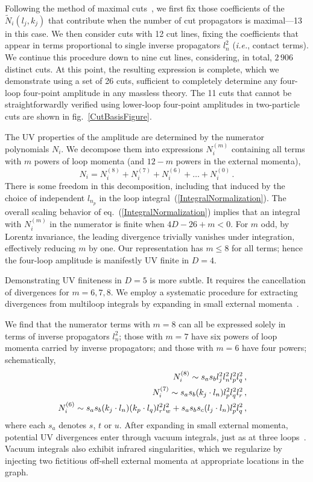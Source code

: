 \documentclass[aps,prl,twocolumn,groupedaddress,draft,showpacs,nofootinbib]{revtex4}
\def\fig#1{fig.~{\ref{#1}}}
\def\nn{\nonumber}
\def\eqn#1{eq.~(\ref{#1})}
\begin{document}
Following the method of maximal cuts~\cite{FiveLoop,CompactThree}, we
first fix those coefficients of the $\widetilde N_i(l_j,k_j)$ 
that contribute when the number of cut propagators is
maximal---13 in this case. We then
consider cuts with 12 cut lines, fixing the coefficients that appear
in terms proportional to single inverse propagators $l_n^2$ ({\it i.e.},
contact terms).  We continue this procedure down to nine cut lines,
considering, in total, $2\,906$ distinct cuts.  At this
point, the resulting expression is complete, which we demonstrate using a
set of 26 cuts, sufficient to completely determine any four-loop
four-point amplitude in any massless theory.  
The 11 cuts that cannot be straightforwardly verified using
lower-loop four-point amplitudes in two-particle cuts are shown in 
\fig{CutBasisFigure}.

The UV properties of the amplitude are determined by the
numerator polynomials $N_i$.  We decompose them into 
expressions $N_i^{(m)}$ containing all terms with $m$ powers of
loop momenta (and ${12-m}$ powers in the external momenta),
%
\begin{equation}
N_i = N_i^{(8)} + N_i^{(7)}  + N_i^{(6)}+ \ldots + N_i^{(0)} \,.
\end{equation}
%
There is some freedom in this decomposition, including
that induced by the choice of independent $l_{n_p}$ 
in the loop integral~(\ref{IntegralNormalization}). 
The overall scaling behavior of
\eqn{IntegralNormalization} implies that an integral with $N_i^{(m)}$
in the numerator is finite when $4 D - 26 + m <0$.  For $m$ odd, by
Lorentz invariance, the leading divergence trivially vanishes under
integration, effectively reducing $m$ by one.  Our representation has
$m\le 8$ for all terms; hence the four-loop amplitude is manifestly UV
finite in $D=4$.

Demonstrating UV finiteness in $D=5$ is more subtle.  It
requires the cancellation of divergences for $m=6,7,8$.  
We employ a systematic procedure for extracting divergences 
from multiloop integrals by expanding in small external
momenta~\cite{MarcusSagnotti}.

We find that the numerator terms with $m=8$ can all
be expressed solely in terms of inverse propagators $l_n^2$;
those with $m=7$ have six powers of loop momenta carried by 
inverse propagators; and those with $m=6$ have four powers; 
schematically,
%
\begin{eqnarray}
&& \hskip -.7cm 
N_i^{(8)} \sim s_a s_b  l_j^2 l_n^2 l_p^2 l_q^2 \,, \nn \\
&& \hskip -.7 cm 
N_i^{(7)} \sim s_a s_b (k_j\cdot l_n) l_p^2 l_q^2 l_r^2 \,,  \\
&& \hskip -.7 cm 
N_i^{(6)} \sim s_a s_b (k_j\cdot l_n) (k_p\cdot l_q) l_r^2 l_w^2 +
s_a s_b s_c  (l_j\cdot l_n)  l_p^2 l_q^2 \,, \nn
\end{eqnarray}
%
where each $s_a$ denotes $s$, $t$ or $u$.
After expanding
in small external momenta, potential UV divergences enter through
vacuum integrals, just as at three loops~\cite{GravityThree}.
Vacuum integrals also exhibit infrared
singularities, which we regularize
by injecting two fictitious off-shell external momenta at appropriate
locations in the graph.
\end{document}
